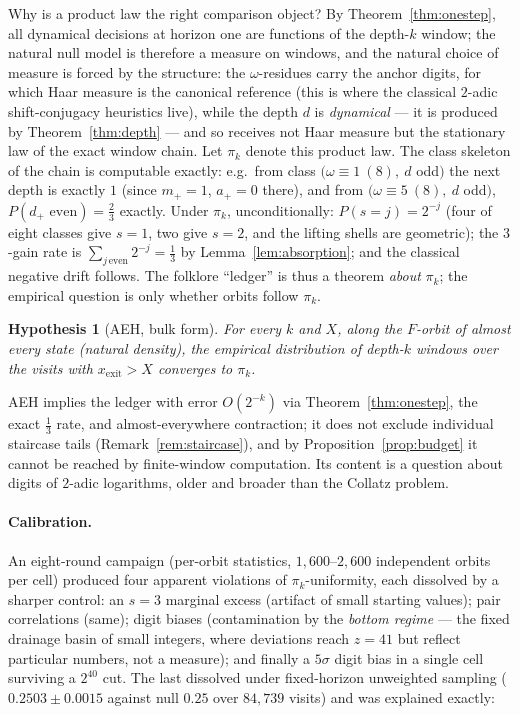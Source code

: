 \documentclass[11pt]{article}
\newtheorem{hypothesis}[theorem]{Hypothesis}
\theoremstyle{remark}
\newcommand{\w}{\omega}
\newcommand{\dnext}{d_{+}}
\begin{document}
Why is a product law the right comparison object? By Theorem~\ref{thm:onestep}, all dynamical decisions at horizon one are functions of the depth-$k$ window; the natural null model is therefore a measure on windows, and the natural choice of measure is forced by the structure: the $\w$-residues carry the anchor digits, for which Haar measure is the canonical reference (this is where the classical $2$-adic shift-conjugacy heuristics live), while the depth $d$ is \emph{dynamical} --- it is produced by Theorem~\ref{thm:depth} --- and so receives not Haar measure but the stationary law of the exact window chain. Let $\pi_k$ denote this product law. The class skeleton of the chain is computable exactly: e.g.\ from class $(\w\equiv1\ (8),\ d$ odd$)$ the next depth is exactly $1$ (since $m_+ = 1$, $a_+ = 0$ there), and from $(\w \equiv 5\ (8),\ d$ odd$)$, $P(\dnext \text{ even}) = \tfrac23$ exactly. Under $\pi_k$, unconditionally: $P(s = j) = 2^{-j}$ (four of eight classes give $s=1$, two give $s=2$, and the lifting shells are geometric); the $3$-gain rate is $\sum_{j\,\mathrm{even}} 2^{-j} = \tfrac13$ by Lemma~\ref{lem:absorption}; and the classical negative drift follows. The folklore ``ledger'' is thus a theorem \emph{about} $\pi_k$; the empirical question is only whether orbits follow $\pi_k$.

\begin{hypothesis}[AEH, bulk form]\label{hyp:aeh}
For every $k$ and $X$, along the $F$-orbit of almost every state (natural density), the empirical distribution of depth-$k$ windows over the visits with $x_{\mathrm{exit}} > X$ converges to $\pi_k$.
\end{hypothesis}

AEH implies the ledger with error $O(2^{-k})$ via Theorem~\ref{thm:onestep}, the exact $\tfrac13$ rate, and almost-everywhere contraction; it does not exclude individual staircase tails (Remark~\ref{rem:staircase}), and by Proposition~\ref{prop:budget} it cannot be reached by finite-window computation. Its content is a question about digits of $2$-adic logarithms, older and broader than the Collatz problem.

\paragraph{Calibration.} An eight-round campaign (per-orbit statistics, $1{,}600$--$2{,}600$ independent orbits per cell) produced four apparent violations of $\pi_k$-uniformity, each dissolved by a sharper control: an $s{=}3$ marginal excess (artifact of small starting values); pair correlations (same); digit biases (contamination by the \emph{bottom regime} --- the fixed drainage basin of small integers, where deviations reach $z=41$ but reflect particular numbers, not a measure); and finally a $5\sigma$ digit bias in a single cell surviving a $2^{40}$ cut. The last dissolved under fixed-horizon unweighted sampling ($0.2503\pm0.0015$ against null $0.25$ over $84{,}739$ visits) and was explained exactly:
\end{document}
